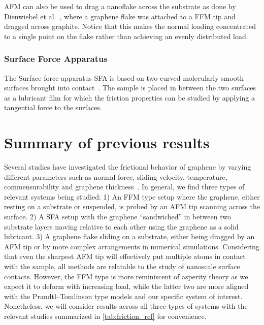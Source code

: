 \acrshort{AFM} can also be used to drag a nanoflake across the substrate as done by
Dienwiebel et al.~\cite{DIENWIEBEL2005197}, where a graphene flake was attached
to a \acrshort{FFM} tip and dragged across graphite. Notice that this makes the normal
loading concentrated to a single point on the flake rather than achieving an evenly distributed load. 



\subsubsection{Surface Force Apparatus}
The Surface force apparatus \acrshort{SFA} is based on two curved molecularly smooth surfaces brought into contact~\cite[p. 188]{gnecco_meyer_2015}. The sample is placed in between the two surfaces as a lubricant film for which the friction properties can be studied by applying a tangential force to the surfaces. 




\section{Summary of previous results}\label{sec:prev_results}
Several studies have investigated the frictional behavior of graphene by varying
different parameters such as normal force, sliding velocity, temperature,
commensurability and graphene thickness~\cite{penkov_tribology_2014}. In
general, we find three types of relevant systems being studied: 1) An
\acrshort{FFM} type setup where the graphene, either resting on a substrate or
suspended, is probed by an \acrshort{AFM} tip scanning across the surface. 2) A
\acrshort{SFA} setup with the graphene ``sandwiched'' in between two
substrate layers moving relative to each other using the graphene as a solid
lubricant. 3) A graphene flake sliding on a substrate, either being dragged by
an \acrshort{AFM} tip or by more complex arrangements in numerical simulations.
Considering that even the sharpest \acrshort{AFM} tip will effectively put
multiple atoms in contact with the sample, all methods are relatable to the study of nanoscale surface contacts. However, the \acrshort{FFM} type is more reminiscent of asperity theory as we expect it to deform with increasing load, while the latter two are more aligned with the Prandtl–Tomlinson type models and our specific system of interest. Nonetheless, we will consider results across all three types of systems with the relevant studies summarized in \cref{tab:friction_ref} for convenience. 


